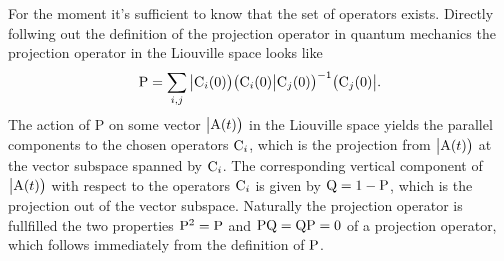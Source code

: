 For the moment it's sufficient to know that the set of operators exists.
Directly follwing out the definition of the projection operator in quantum mechanics the projection operator in the Liouville space looks like
%
\begin{align}
	\mathrm{P} = \sum\limits_{i,j} \big|{\mathrm{C}_{i}(0)}\big) \big({\mathrm{C}_{i}(0)}\big|{\mathrm{C}_{j}(0)}\big)^{-1} \big({\mathrm{C}_{j}(0)}\big|.
	\label{eq: projection operator}
\end{align}
%
The action of P on some vector $\big|{\mathrm{A}(t)}\big)$ in the Liouville space yields the parallel components to the chosen operators $\mathrm{C}_{i}$, which is the projection from $\big|{\mathrm{A}(t)}\big)$ at the vector subspace spanned by $\mathrm{C}_{i}$.
The corresponding vertical component of $\big|{\mathrm{A}(t)}\big)$ with respect to the operators $\mathrm{C}_{i}$ is given by $\mathrm{Q} = 1- \mathrm{P}$, which is the projection out of the vector subspace.
Naturally the projection operator is fullfilled the two properties $\mathrm{P}^{2} = \mathrm{P}$ and $\mathrm{PQ} = \mathrm{QP} = 0$ of a projection operator, which follows immediately from the definition of $\mathrm{P}$.

